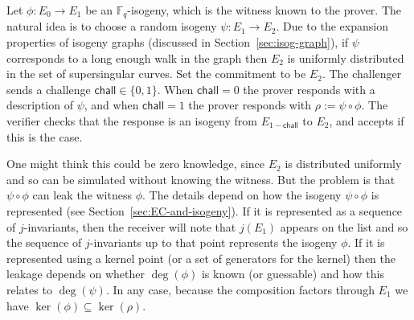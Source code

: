 \documentclass{llncs}
\newcommand{\chall}{\mathsf{chall}}
\newcommand{\F}{\ensuremath{\mathbb{F}}}
\begin{document}
Let $\phi : E_0 \to E_1$ be an $\F_q$-isogeny, which is the witness known to the prover.
The natural idea is to choose a random isogeny $\psi : E_1 \to E_2$.
Due to the expansion properties of isogeny graphs (discussed in Section~\ref{sec:isog-graph}), if $\psi$ corresponds to a long enough walk in the graph then $E_2$ is uniformly distributed in the set of supersingular curves.
Set the commitment to be $E_2$.
The challenger sends a challenge $\chall \in \{0,1\}$.
When $\chall = 0$ the prover responds with a description of $\psi$, and when $\chall=1$ the prover responds with $\rho := \psi \circ \phi$.
The verifier checks that the response is an isogeny from $E_{1-\chall}$ to $E_2$, and accepts if this is the case.

One might think this could be zero knowledge, since $E_2$ is distributed uniformly and so can be simulated without knowing the witness.
But the problem is that $\psi \circ \phi$ can leak the witness $\phi$.
The details depend on how the isogeny $\psi \circ \phi$ is represented (see Section~\ref{sec:EC-and-isogeny}). If it is represented as a sequence of $j$-invariants, then the receiver will note that $j(E_1)$ appears on the list and so the sequence of $j$-invariants up to that point represents the isogeny $\phi$.
If it is represented using a kernel point (or a set of generators for the kernel) then the leakage depends on whether $\deg(\phi)$ is known (or guessable) and how this relates to $\deg(\psi)$. In any case, because the composition factors through $E_1$ we have $\ker(\phi) \subseteq \ker( \rho )$.
\end{document}
